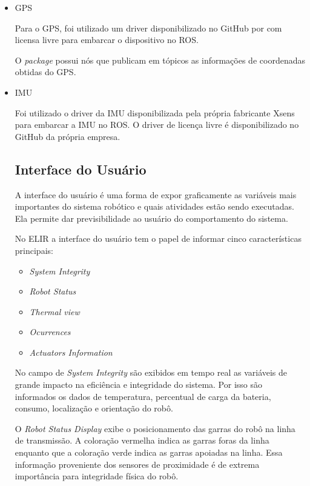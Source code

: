 \begin{itemize}
		\item GPS
		
		Para o GPS, foi utilizado um driver disponibilizado no GitHub por  com licensa livre para embarcar o dispositivo no ROS.
		
		O \textit{package} possui nós que publicam em tópicos as informações de coordenadas obtidas do GPS.
		
		\item IMU
		
		Foi utilizado o driver da IMU disponibilizada pela própria fabricante Xsens para embarcar a IMU no ROS. O driver de licença livre é disponibilizado no GitHub da própria empresa.
	
	\subsection{Interface do Usuário}
	\label{sec:ui}
	
	A interface do usuário é uma forma de expor graficamente as variáveis mais importantes do sistema robótico e quais atividades estão sendo executadas. Ela permite dar previsibilidade ao usuário do comportamento do sistema. 
	
	No ELIR a interface do usuário tem o papel de informar cinco características principais:
	
	\begin{itemize}
		\item \textit{System Integrity}
		\item \textit{Robot Status}
		\item \textit{Thermal view}
		\item \textit{Ocurrences}
		\item \textit{Actuators Information}
	\end{itemize}
	
	No campo de \textit{System Integrity} são exibidos em tempo real as variáveis de grande impacto na eficiência e integridade do sistema. Por isso são informados os dados de temperatura, percentual de carga da bateria, consumo, localização e orientação do robô.
	
	O \textit{Robot Status Display} exibe o posicionamento das garras do robô na linha de transmissão. A coloração vermelha indica as garras foras da linha enquanto que a coloração verde indica as garras apoiadas na linha. Essa informação proveniente dos sensores de proximidade é de extrema importância para integridade física do robô.
	

\end{itemize}
